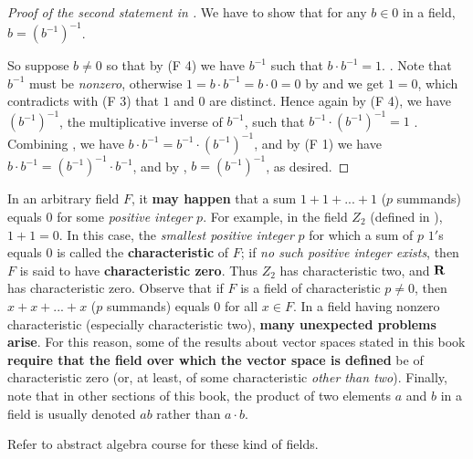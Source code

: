 \begin{proof}[Proof of the second statement in ]
We have to show that for any \(b \in 0\) in a field, \(b = (b^{-1})^{-1}\).

So suppose \(b \ne 0\) so that by (F 4) we have \(b^{-1}\) such that \(b \cdot b^{-1} = 1\). .
Note that \(b^{-1}\) must be \emph{nonzero}, otherwise \(1 = b \cdot b^{-1} = b \cdot 0 = 0\) by  and we get \(1 = 0\), which contradicts with (F 3) that \(1\) and \(0\) are distinct.
Hence again by (F 4), we have \((b^{-1})^{-1}\), the multiplicative inverse of \(b^{-1}\), such that \(b^{-1} \cdot (b^{-1})^{-1} = 1\) .
Combining , we have \(b \cdot b^{-1} = b^{-1} \cdot (b^{-1})^{-1}\), and by (F 1) we have \(b \cdot b^{-1} = (b^{-1})^{-1} \cdot b^{-1}\), and by , \(b = (b^{-1})^{-1}\), as desired.
\end{proof}

\begin{remark} \label{remark c.3}
In an arbitrary field \(F\), it \textbf{may happen} that a sum \(1 + 1 + ... + 1\) (\(p\) summands) equals \(0\) for some \emph{positive integer} \(p\).
For example, in the field \(Z_2\) (defined in ), \(1 + 1 = 0\).
In this case, the \emph{smallest positive integer} \(p\) for which a sum of \(p\) \(1'\)s equals \(0\) is called the \textbf{characteristic} of \(F\);
if \emph{no such positive integer exists}, then \(F\) is said to have \textbf{characteristic zero}.
Thus \(Z_2\) has characteristic two, and \(\mathbf{R}\) has characteristic zero.
Observe that if \(F\) is a field of characteristic \(p \ne 0\), then \(x + x + ... + x\) (\(p\) summands) equals \(0\) for all \(x \in F\).
In a field having nonzero characteristic (especially characteristic two), \textbf{many unexpected problems arise}.
For this reason, some of the results about vector spaces stated in this book \textbf{require that the field over which the vector space is defined} be of characteristic zero (or, at least, of some characteristic \emph{other than two}).
Finally, note that in other sections of this book, the product of two elements \(a\) and \(b\) in a field is usually denoted \(ab\) rather than \(a \cdot b\).

Refer to abstract algebra course for these kind of fields.
\end{remark}
